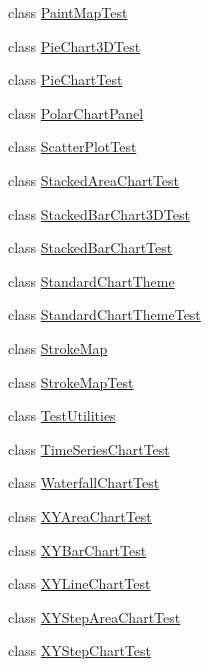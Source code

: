 \begin{DoxyCompactItemize}
class \mbox{\hyperlink{classorg_1_1jfree_1_1chart_1_1_paint_map_test}{Paint\+Map\+Test}}
\item 
class \mbox{\hyperlink{classorg_1_1jfree_1_1chart_1_1_pie_chart3_d_test}{Pie\+Chart3\+D\+Test}}
\item 
class \mbox{\hyperlink{classorg_1_1jfree_1_1chart_1_1_pie_chart_test}{Pie\+Chart\+Test}}
\item 
class \mbox{\hyperlink{classorg_1_1jfree_1_1chart_1_1_polar_chart_panel}{Polar\+Chart\+Panel}}
\item 
class \mbox{\hyperlink{classorg_1_1jfree_1_1chart_1_1_scatter_plot_test}{Scatter\+Plot\+Test}}
\item 
class \mbox{\hyperlink{classorg_1_1jfree_1_1chart_1_1_stacked_area_chart_test}{Stacked\+Area\+Chart\+Test}}
\item 
class \mbox{\hyperlink{classorg_1_1jfree_1_1chart_1_1_stacked_bar_chart3_d_test}{Stacked\+Bar\+Chart3\+D\+Test}}
\item 
class \mbox{\hyperlink{classorg_1_1jfree_1_1chart_1_1_stacked_bar_chart_test}{Stacked\+Bar\+Chart\+Test}}
\item 
class \mbox{\hyperlink{classorg_1_1jfree_1_1chart_1_1_standard_chart_theme}{Standard\+Chart\+Theme}}
\item 
class \mbox{\hyperlink{classorg_1_1jfree_1_1chart_1_1_standard_chart_theme_test}{Standard\+Chart\+Theme\+Test}}
\item 
class \mbox{\hyperlink{classorg_1_1jfree_1_1chart_1_1_stroke_map}{Stroke\+Map}}
\item 
class \mbox{\hyperlink{classorg_1_1jfree_1_1chart_1_1_stroke_map_test}{Stroke\+Map\+Test}}
\item 
class \mbox{\hyperlink{classorg_1_1jfree_1_1chart_1_1_test_utilities}{Test\+Utilities}}
\item 
class \mbox{\hyperlink{classorg_1_1jfree_1_1chart_1_1_time_series_chart_test}{Time\+Series\+Chart\+Test}}
\item 
class \mbox{\hyperlink{classorg_1_1jfree_1_1chart_1_1_waterfall_chart_test}{Waterfall\+Chart\+Test}}
\item 
class \mbox{\hyperlink{classorg_1_1jfree_1_1chart_1_1_x_y_area_chart_test}{X\+Y\+Area\+Chart\+Test}}
\item 
class \mbox{\hyperlink{classorg_1_1jfree_1_1chart_1_1_x_y_bar_chart_test}{X\+Y\+Bar\+Chart\+Test}}
\item 
class \mbox{\hyperlink{classorg_1_1jfree_1_1chart_1_1_x_y_line_chart_test}{X\+Y\+Line\+Chart\+Test}}
\item 
class \mbox{\hyperlink{classorg_1_1jfree_1_1chart_1_1_x_y_step_area_chart_test}{X\+Y\+Step\+Area\+Chart\+Test}}
\item 
class \mbox{\hyperlink{classorg_1_1jfree_1_1chart_1_1_x_y_step_chart_test}{X\+Y\+Step\+Chart\+Test}}
\end{DoxyCompactItemize}
